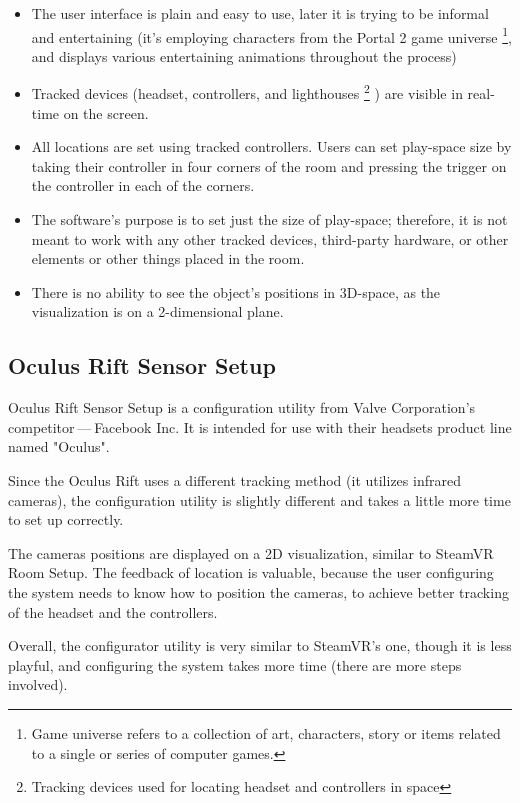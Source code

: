 \begin{itemize}
\item The user interface is plain and easy to use, later it is trying to be informal
and entertaining (it’s employing characters from the Portal 2 game universe
\footnote{Game universe refers to a collection of art, characters, story or items related to a single or series of computer games.},
and displays various entertaining animations throughout the process)
\item Tracked devices (headset, controllers, and lighthouses
\footnote{Tracking devices used for locating headset and controllers in space}
) are visible in
real-time on the screen.
\item All locations are set using tracked controllers. Users can set play-space
size by taking their controller in four corners of the room and pressing
the trigger on the controller in each of the corners.
\item The software’s purpose is to set just the size of play-space; therefore, it is not
meant to work with any other tracked devices, third-party hardware, or other elements or
other things placed in the room.
\item There is no ability to see the object’s positions in 3D-space, as the visualization is
on a 2-dimensional plane.
\end{itemize}


\hypertarget{x-oculus-rift-sensor-setup}{\subsection{Oculus Rift Sensor Setup}}
Oculus Rift Sensor Setup is a configuration utility from Valve Corporation’s
competitor — Facebook Inc. It is intended for use with their headsets
product line named "Oculus".


Since the Oculus Rift uses a different tracking method (it utilizes infrared cameras),
the configuration utility is slightly different and takes a little more
time to set up correctly.


The cameras positions are displayed on a 2D visualization, similar
to SteamVR Room Setup. The feedback of location is valuable, because the
user configuring the system needs to know how to position the
cameras, to achieve better tracking of the headset and the controllers.


Overall, the configurator utility is very similar to SteamVR’s one, though it
is less playful, and configuring the system takes more time (there are more steps
involved).


